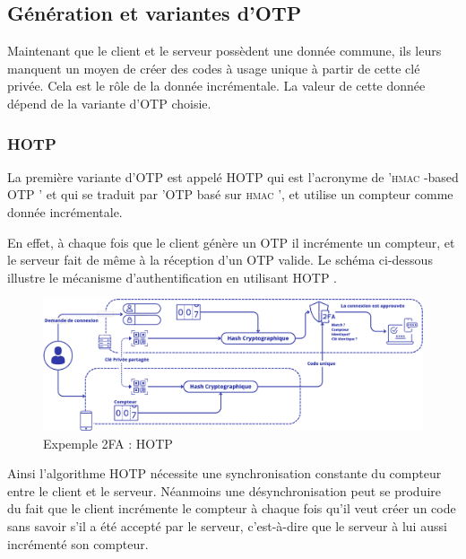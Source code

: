 \documentclass[a4paper, 10pt]{article}
\newcommand{\otp}{\textsc{OTP} }
\newcommand{\hotp}{\textsc{HOTP} }
\newcommand{\hmac}{\textsc{hmac} }
\begin{document}
        \subsection{Génération et variantes d'\otp}

    Maintenant que le client et le serveur possèdent une \textcolor{mygreen}{donnée commune}, ils leurs manquent un \textcolor{myblue}{moyen de créer des codes à usage unique} à partir de cette clé privée. Cela est le rôle de la \textcolor{mygreen}{donnée incrémentale}. La valeur de cette donnée dépend de la variante d'\otp choisie.

            \subsubsection{\hotp}
            
    La première variante d'\otp est appelé \hotp 
qui est l'acronyme de \textcolor{myblue}{'\hmac-based \otp'} et qui se traduit par '\otp basé sur \hmac', 
et utilise un \textcolor{mygreen}{compteur} comme donnée incrémentale.

    En effet, à chaque fois que le client génère un \otp il incrémente un compteur, et le serveur fait de même à la réception d'un \otp valide. Le schéma ci-dessous illustre le mécanisme d'authentification en utilisant \hotp.


\begin{figure}[H]
        \centering
        \includegraphics[scale=0.30]{img/1/2/2FA-hotp.png}
        \caption{Expemple 2FA : \hotp\\}
        \label{fig:2fa-hotp}
\end{figure}


Ainsi l'algorithme \hotp nécessite une \textcolor{myblue}{synchronisation constante du compteur} entre le client et le serveur. 
Néanmoins une \textcolor{myblue}{désynchronisation} peut se produire du fait que le client incrémente le compteur à chaque fois qu’il veut créer un code sans savoir s’il a été accepté par le serveur, c’est-à-dire que le serveur à lui aussi incrémenté son compteur.\\
\end{document}
